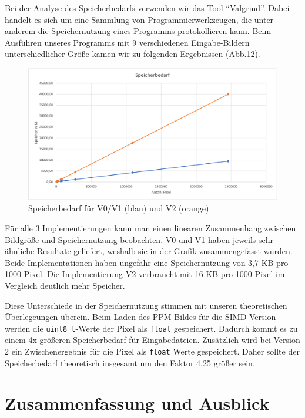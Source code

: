 \documentclass[course=erap]{aspdoc}
\begin{document}
\par
Bei der Analyse des Speicherbedarfs verwenden wir das Tool “Valgrind”. Dabei handelt es sich um eine Sammlung von Programmierwerkzeugen, die unter anderem die Speichernutzung eines Programms protokollieren kann. Beim Ausführen unseres Programms mit 9 verschiedenen Eingabe-Bildern unterschiedlicher Größe kamen wir zu folgenden Ergebnissen (Abb.12).

\begin{figure}[h]
\centering
\includegraphics[width=1\textwidth]{Bilder/Speicherbedarf.png}
\caption{Speicherbedarf für V0/V1 (blau) und V2 (orange)}
\end{figure}

\par
Für alle 3 Implementierungen kann man einen linearen Zusammenhang zwischen Bildgröße und Speichernutzung beobachten. V0 und V1 haben jeweils sehr ähnliche Resultate geliefert, weshalb sie in der Grafik zusammengefasst wurden. Beide Implementationen haben ungefähr eine Speichernutzung von 3,7 KB pro 1000 Pixel. Die Implementierung V2 verbraucht mit 16 KB pro 1000 Pixel im Vergleich deutlich mehr Speicher.

\par
Diese Unterschiede in der Speichernutzung stimmen mit unseren theoretischen Überlegeungen überein. Beim Laden des PPM-Bildes für die SIMD Version werden die \texttt{uint8\_t}-Werte der Pixel als \texttt{float} gespeichert. Dadurch kommt es zu einem 4x größeren Speicherbedarf für Eingabedateien. Zusätzlich wird bei Version 2 ein Zwischenergebnis für die Pixel als \texttt{float} Werte gespeichert. Daher sollte der Speicherbedarf theoretisch insgesamt um den Faktor 4,25 größer sein. 

\section{Zusammenfassung und Ausblick}
\end{document}
